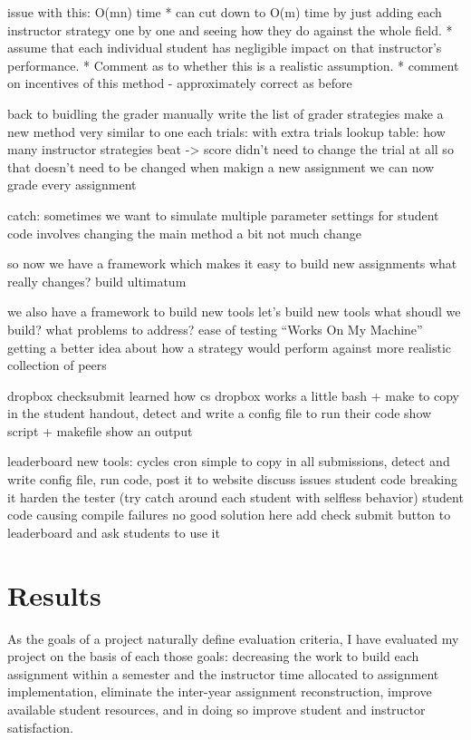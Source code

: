 \documentclass[pageno]{jpaper}
\begin{document}
issue with this: O(mn) time
* can cut down to O(m) time by just adding each instructor strategy one by one and seeing how they do against the whole field.
* assume that each individual student has negligible impact on that instructor's performance.
* Comment as to whether this is a realistic assumption.
* comment on incentives of this method - approximately correct as before

back to buidling the grader
manually write the list of grader strategies
make a new method very similar to one each trials: with extra trials
lookup table: how many instructor strategies beat -> score
didn't need to change the trial at all
so that doesn't need to be changed when makign a new assignment
we can now grade every assignment

catch: sometimes we want to simulate multiple parameter settings for student code
involves changing the main method a bit
not much change

so now we have a framework which makes it easy to build new assignments
what really changes?
build ultimatum

we also have a framework to build new tools
let's build new tools
what shoudl we build?
what problems to address?
ease of testing
``Works On My Machine''
getting a better idea about how a strategy would perform against more realistic collection of peers

dropbox checksubmit
learned how cs dropbox works
a little bash + make to copy in the student handout, detect and write a config file to run their code
show script + makefile
show an output

leaderboard
new tools: cycles cron
simple to copy in all submissions, detect and write config file, run code, post it to website
discuss issues
student code breaking it
harden the tester (try catch around each student with selfless behavior)
student code causing compile failures
no good solution here
add check submit button to leaderboard and ask students to use it

\section*{Results}
As the goals of a project naturally define evaluation criteria, I have evaluated my project on the basis of each those goals: decreasing the work to build each assignment within a semester and the instructor time allocated to assignment implementation, eliminate the inter-year assignment reconstruction, improve available student resources, and in doing so improve student and instructor satisfaction.
\end{document}
